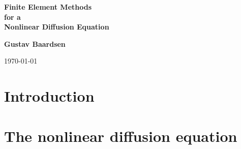 \documentclass[twoside]{article}
\begin{document}






\begin{center}
{\LARGE\bf Finite Element Methods \\ [0.1mm] for a \\ [1.5mm] Nonlinear Diffusion Equation}
\end{center}





\begin{center}
{\bf Gustav Baardsen} \\ [0mm]
\end{center}






\begin{center}
\today
\end{center}

\vspace{1cm}



\begin{abstract}
A standard finite element method is formulated for a general 
nonlinear diffusion equation. The equation is discretized in 
time using the Backward Euler method, and the nonlinear 
algebraic equations are solved with a Picard iteration 
scheme applied at the partial differential equation 
(PDE) level. The formulated numerical scheme is implemented 
using the FEniCS software package. Finally, explicit 
expressions needed for Newton's method are derived. 

\end{abstract}

\tableofcontents



\section{Introduction}

\label{Introduction}


\section{The nonlinear diffusion equation}
\label{pde}
\end{document}
